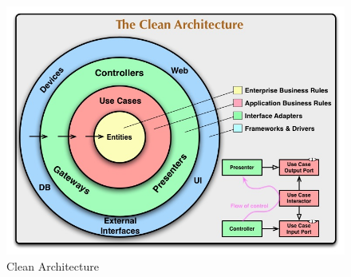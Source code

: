 \begin{figure}
    \centering
    \includegraphics[width=\textwidth]{assets/clean_architecture.jpg}
    \caption{Clean Architecture}
    \label{fig:clean_architecture}
\end{figure}
